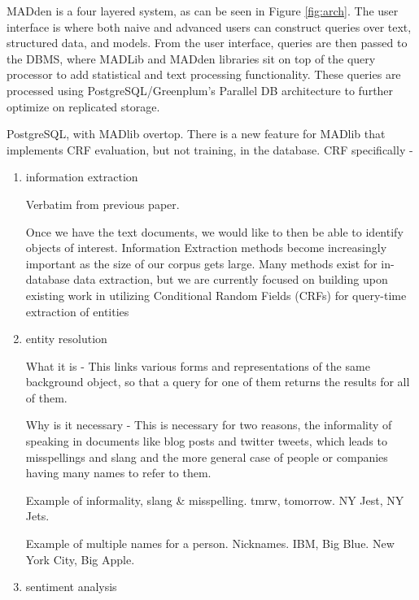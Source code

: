 \documentclass{article}
\newcommand{\system}{MADden\xspace}
\begin{document}
\begin{enumerate}
\begin{enumerate}
\begin{enumerate}
      {\system} is a four layered system, as can be seen in Figure \ref{fig:arch}.
      The user interface is where both naive and advanced users can construct queries over text, structured data, and models.
      From the user interface,
      queries are then passed to the DBMS,
      where MADLib and {\system} libraries sit on top of the query processor to add statistical and text processing functionality.
      These queries are processed using PostgreSQL/Greenplum's Parallel DB architecture to further optimize on replicated storage.


      PostgreSQL, with MADlib overtop.
      There is a new feature for MADlib that implements CRF evaluation, but not training, in the database.
      CRF specifically -

      \begin{enumerate}
      \item information extraction
        
        Verbatim from previous paper.

        Once we have the text documents, we would like to then be able to identify
        objects of interest. Information Extraction methods become increasingly
        important as the size of our corpus gets large. Many methods exist for in-database data
        extraction, but we are currently focused on building upon existing work in
        utilizing Conditional Random Fields (CRFs) for query-time extraction of
        entities

      \item entity resolution

        What it is -
        This links various forms and representations of the same background object,
        so that a query for one of them returns the results for all of them.

        Why is it necessary -
        This is necessary for two reasons,
        the informality of speaking in documents like blog posts and twitter tweets,
        which leads to misspellings and slang
        and the more general case of people or companies having many names to refer to them.

        Example of informality, slang \& misspelling. tmrw, tomorrow. NY Jest, NY Jets.

        Example of multiple names for a person. Nicknames. IBM, Big Blue. New York City, Big Apple.

      \item sentiment analysis


\end{enumerate}
\end{enumerate}
\end{enumerate}
\end{enumerate}
\end{document}
